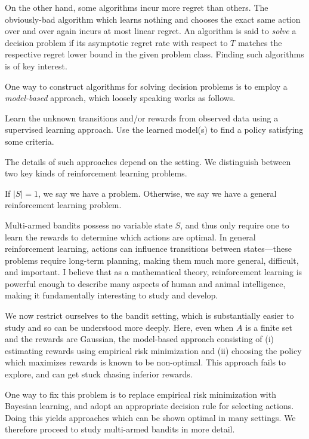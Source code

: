 \documentclass[11pt]{book}
\begin{document}
On the other hand, some algorithms incur more regret than others.
The obviously-bad algorithm which learns nothing and chooses the exact same action over and over again incurs at most linear regret.
An algorithm is said to \emph{solve} a decision problem if its asymptotic regret rate with respect to $T$ matches the respective regret lower bound in the given problem class.
Finding such algorithms is of key interest.

One way to construct algorithms for solving decision problems is to employ a \emph{model-based} approach, which loosely speaking works as follows.

\1 Learn the unknown transitions and/or rewards from observed data using a supervised learning approach.
\2 Use the learned model(s) to find a policy satisfying some criteria.
\0 

The details of such approaches depend on the setting.
We distinguish between two key kinds of reinforcement learning problems.

\1 If $|S| = 1$, we say we have a  problem.
\2 Otherwise, we say we have a general reinforcement learning problem.
\0 

Multi-armed bandits possess no variable state $S$, and thus only require one to learn the rewards to determine which actions are optimal.
In general reinforcement learning, actions can influence transitions between states---these problems require long-term planning, making them much more general, difficult, and important.
I believe that as a mathematical theory, reinforcement learning is powerful enough to describe many aspects of human and animal intelligence, making it fundamentally interesting to study and develop.

We now restrict ourselves to the bandit setting, which is substantially easier to study and so can be understood more deeply.
Here, even when $A$ is a finite set and the rewards are Gaussian, the model-based approach consisting of (i) estimating rewards using empirical risk minimization and (ii) choosing the policy which maximizes rewards is known to be non-optimal.
This approach fails to explore, and can get stuck chasing inferior rewards.

One way to fix this problem is to replace empirical risk minimization with Bayesian learning, and adopt an appropriate decision rule for selecting actions.
Doing this yields approaches which can be shown optimal in many settings.
We therefore proceed to study multi-armed bandits in more detail.
\end{document}
